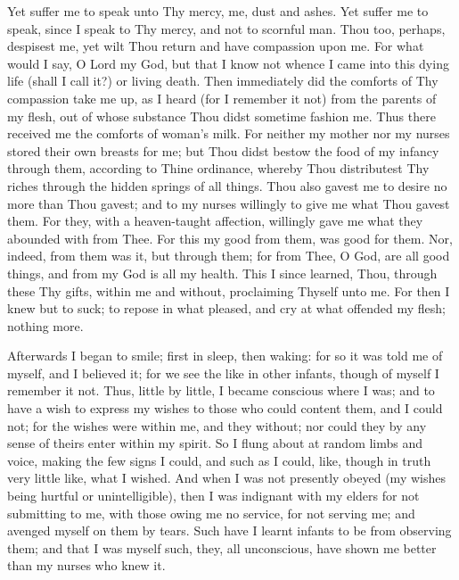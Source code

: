 \documentclass[b5paper,openright,12pt,twoside]{book}
\begin{document}
Yet suffer me to speak unto Thy mercy, me, dust and ashes. Yet suffer me
to speak, since I speak to Thy mercy, and not to scornful man. Thou too,
perhaps, despisest me, yet wilt Thou return and have compassion upon me.
For what would I say, O Lord my God, but that I know not whence I
came into this dying life (shall I call it?) or living death. Then
immediately did the comforts of Thy compassion take me up, as I heard
(for I remember it not) from the parents of my flesh, out of whose
substance Thou didst sometime fashion me. Thus there received me the
comforts of woman's milk. For neither my mother nor my nurses stored
their own breasts for me; but Thou didst bestow the food of my infancy
through them, according to Thine ordinance, whereby Thou distributest
Thy riches through the hidden springs of all things. Thou also gavest me
to desire no more than Thou gavest; and to my nurses willingly to give
me what Thou gavest them. For they, with a heaven-taught affection,
willingly gave me what they abounded with from Thee. For this my good
from them, was good for them. Nor, indeed, from them was it, but through
them; for from Thee, O God, are all good things, and from my God is all
my health. This I since learned, Thou, through these Thy gifts, within
me and without, proclaiming Thyself unto me. For then I knew but to
suck; to repose in what pleased, and cry at what offended my flesh;
nothing more.

Afterwards I began to smile; first in sleep, then waking: for so it
was told me of myself, and I believed it; for we see the like in other
infants, though of myself I remember it not. Thus, little by little, I
became conscious where I was; and to have a wish to express my wishes
to those who could content them, and I could not; for the wishes were
within me, and they without; nor could they by any sense of theirs enter
within my spirit. So I flung about at random limbs and voice, making
the few signs I could, and such as I could, like, though in truth very
little like, what I wished. And when I was not presently obeyed (my
wishes being hurtful or unintelligible), then I was indignant with my
elders for not submitting to me, with those owing me no service, for
not serving me; and avenged myself on them by tears. Such have I learnt
infants to be from observing them; and that I was myself such, they, all
unconscious, have shown me better than my nurses who knew it.
\end{document}
